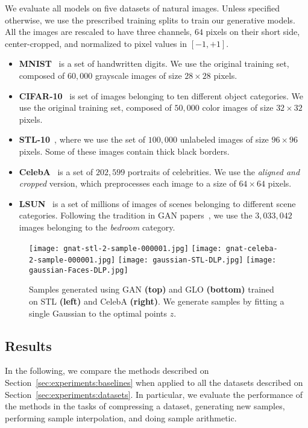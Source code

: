 \documentclass{article}
\newcommand{\GNAT}{GLO}
\begin{document}
We evaluate all models on five datasets of natural images. Unless specified
otherwise, we use the prescribed training splits to train our generative
models. All the images are rescaled to have three channels, $64$ pixels on
their short side, center-cropped, and normalized to pixel values in $[-1,+1]$.
\begin{itemize}
  \item \textbf{MNIST}~\citep{mnist} is a set of handwritten digits.  We use the
  original training set, composed of $60,000$ grayscale images of size
  $28\times 28$ pixels.
  \item \textbf{CIFAR-10}~\citep{krizhevsky2009learning} is set of images
  belonging to ten different object categories.
  We use the original training set, composed of $50,000$ color
  images of size $32 \times 32$ pixels.
  \item \textbf{STL-10}~\citep{coates2011analysis}, where we use the set of
  $100,000$ unlabeled images of size $96 \times 96$ pixels. Some of these
  images contain thick black borders.
  \item \textbf{CelebA}~\citep{liu2015faceattributes} is a set of $202,599$
  portraits of celebrities. We use the \emph{aligned and cropped} version,
  which preprocesses each image to a size of $64\times 64$ pixels.
  \item \textbf{LSUN}~\citep{xiao2010sun} is a set of millions of images of
  scenes belonging to different scene categories. Following the tradition in
  GAN papers~\citep{dcgan}, we use the $3,033,042$ images belonging
  to the \emph{bedroom} category.
\end{itemize}

\begin{figure}[t]
  \begin{center}
  \texttt{[image: gnat-stl-2-sample-000001.jpg]}
  \texttt{[image: gnat-celeba-2-sample-000001.jpg]}
  \texttt{[image: gaussian-STL-DLP.jpg]}
  \texttt{[image: gaussian-Faces-DLP.jpg]}
  \end{center}
  \caption{
    Samples generated using GAN \textbf{(top)} and \GNAT{} \textbf{(bottom)} trained on STL \textbf{(left)} and CelebA
    \textbf{(right)}.  We generate samples by fitting a single
    Gaussian to the optimal points $z$.
  }
  \label{fig:samples}
\end{figure}

\newpage
\subsection{Results}\label{sec:experiments:results}
In the following, we compare the methods described on
Section~\ref{sec:experiments:baselines} when applied to all the datasets
described on Section~\ref{sec:experiments:datasets}. In particular, we evaluate
the performance of the methods in the tasks of compressing a dataset,
generating new samples, performing sample interpolation, and doing sample
arithmetic.
\end{document}
